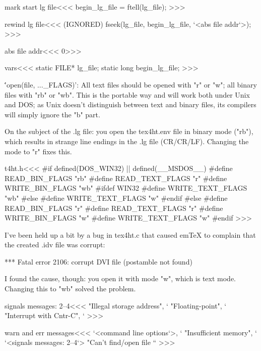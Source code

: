 {{{{{{{\<mark start lg file\><<<
begin_lg_file = ftell(lg_file);
>>>

\<rewind lg file\><<<
(IGNORED)  fseek(lg_file, begin_lg_file, `<abs file addr`>);
>>>

\<abs file addr\><<<
0>>>




\<vars\><<<
static FILE* lg_file;
static long  begin_lg_file;
>>>





\''open(file, ..._FLAGS)': All
text files should be opened with "r" or "w"; all binary files with "rb"
or "wb". This is the portable way and will work both under Unix and DOS;
as Unix doesn't distinguish between text and binary files, its compilers
will simply ignore the "b" part.

  On the subject of the .lg file: you open the tex4ht.env file in binary
mode ("rb"), which results in strange line endings in the .lg file
(CR/CR/LF). Changing the mode to "r" fixes this.


\<t4ht.h\><<<
#if defined(DOS_WIN32) || defined(__MSDOS__)
#define READ_BIN_FLAGS "rb"
#define READ_TEXT_FLAGS "r"
#define WRITE_BIN_FLAGS "wb"
#ifdef WIN32
#define WRITE_TEXT_FLAGS "wb"
#else
#define WRITE_TEXT_FLAGS "w"
#endif
#else
#define READ_BIN_FLAGS "r"
#define READ_TEXT_FLAGS "r"
#define WRITE_BIN_FLAGS "w"
#define WRITE_TEXT_FLAGS "w"
#endif
>>>



\Verbatim
I've been held up a bit by a
bug in tex4ht.c that caused emTeX to complain that the created .idv file
was corrupt:

*** Fatal error 2106: corrupt DVI file (postamble not found)

  I found the cause, though: you open it with mode "w", which is text
mode. Changing this to "wb" solved the problem.
\EndVerbatim












\<signals messages: 2--4\><<<
"Illegal storage address\n", `%
"Floating-point\n",          `%
"Interrupt with Cntr-C\n",   `%
>>>

\<warn and err messages\><<<
`<command line options`>,                            `%
"Insufficient memory\n",                                `%
`<signals messages: 2--4`>
"Can't find/open file ``%
>>>



}}}}}}}

